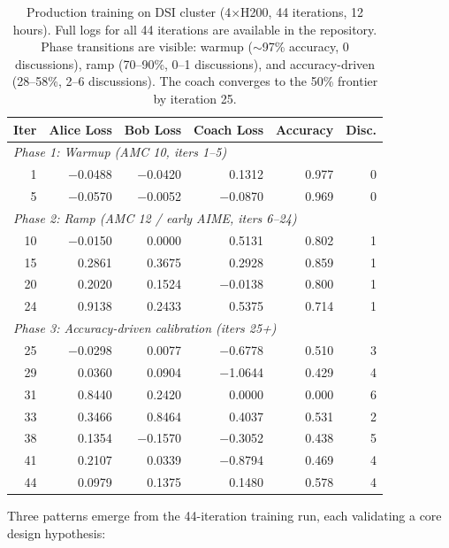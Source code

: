 \documentclass{article}
\begin{document}
\begin{table}[h]
\centering
\small
\begin{tabular}{rrrrrr}
\toprule
\textbf{Iter} & \textbf{Alice Loss} & \textbf{Bob Loss} & \textbf{Coach Loss} & \textbf{Accuracy} & \textbf{Disc.} \\
\midrule
\multicolumn{6}{l}{\emph{Phase 1: Warmup (AMC 10, iters 1--5)}} \\
1 & $-$0.0488 & $-$0.0420 & 0.1312 & 0.977 & 0 \\
5 & $-$0.0570 & $-$0.0052 & $-$0.0870 & 0.969 & 0 \\
\midrule
\multicolumn{6}{l}{\emph{Phase 2: Ramp (AMC 12 / early AIME, iters 6--24)}} \\
10 & $-$0.0150 & 0.0000 & 0.5131 & 0.802 & 1 \\
15 & 0.2861 & 0.3675 & 0.2928 & 0.859 & 1 \\
20 & 0.2020 & 0.1524 & $-$0.0138 & 0.800 & 1 \\
24 & 0.9138 & 0.2433 & 0.5375 & 0.714 & 1 \\
\midrule
\multicolumn{6}{l}{\emph{Phase 3: Accuracy-driven calibration (iters 25+)}} \\
25 & $-$0.0298 & 0.0077 & $-$0.6778 & 0.510 & 3 \\
29 & 0.0360 & 0.0904 & $-$1.0644 & 0.429 & 4 \\
31 & 0.8440 & 0.2420 & 0.0000 & 0.000 & 6 \\
33 & 0.3466 & 0.8464 & 0.4037 & 0.531 & 2 \\
38 & 0.1354 & $-$0.1570 & $-$0.3052 & 0.438 & 5 \\
41 & 0.2107 & 0.0339 & $-$0.8794 & 0.469 & 4 \\
44 & 0.0979 & 0.1375 & 0.1480 & 0.578 & 4 \\
\bottomrule
\end{tabular}
\caption{Production training on DSI cluster (4$\times$H200, 44 iterations, 12 hours). Full logs for all 44 iterations are available in the repository. Phase transitions are visible: warmup (${\sim}$97\% accuracy, 0 discussions), ramp (70--90\%, 0--1 discussions), and accuracy-driven (28--58\%, 2--6 discussions). The coach converges to the 50\% frontier by iteration 25.}
\label{tab:production}
\end{table}

Three patterns emerge from the 44-iteration training run, each validating a core design hypothesis:
\end{document}
